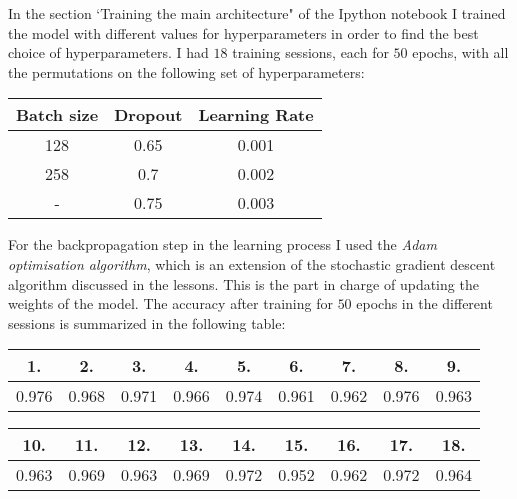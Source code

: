 \documentclass[11pt, a4paper]{amsart}
\begin{document}
In the section `Training the main architecture" of the Ipython notebook I trained the model with different values for hyperparameters in order to find the best choice of hyperparameters. I had $18$ training sessions, each for $50$ epochs, with all the permutations on the following set of hyperparameters: 
\begin{center}
\begin{tabular}{|c|c|c|}
\hline
Batch size & Dropout & Learning Rate \\ \hline
128 & 0.65 & 0.001 \\ \hline
258 & 0.7 & 0.002  \\ \hline
- & 0.75 & 0.003 \\ \hline
\end{tabular}
\end{center}
\noindent
\newline
\noindent 
For the backpropagation step in the learning process I used the \textit{Adam optimisation algorithm}, which is an extension of the stochastic gradient descent algorithm discussed in the lessons. This is the part in charge of updating the weights of the model. 
The accuracy after training for $50$ epochs in the different sessions is summarized in the following table:
\begin{center}
\begin{tabular}{|c|c|c|c|c|c|c|c|c|}
\hline
1. & 2. & 3. & 4. & 5. & 6. & 7. &  8. & 9. \\ \hline
0.976 & 0.968 & 0.971 & 0.966 & 0.974 &  0.961 & 0.962 &  0.976 & 0.963 \\ \hline
\end{tabular}
\end{center}
\begin{center}
\begin{tabular}{|c|c|c|c|c|c|c|c|c|}
\hline
10. & 11. & 12. & 13. & 14. & 15. & 16. & 17. & 18.\\ \hline
0.963 & 0.969 & 0.963 & 0.969 & 0.972 & 0.952 & 0.962 & 0.972 &  0.964 \\ \hline
\end{tabular}
\end{center}
\noindent
\newline
\noindent 
\end{document}
